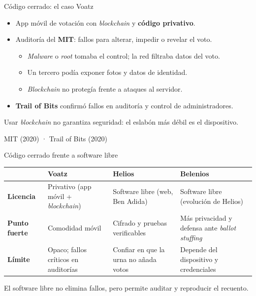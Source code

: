 \documentclass[aspectratio=169,12pt]{beamer}
\newcommand{\fuente}[1]{\vfill{\small\color{gris}#1\par}}
\begin{document}
\begin{frame}{Código cerrado: el caso Voatz}
  \begin{itemize}
    \item App móvil de votación con \textit{blockchain} y \textbf{código privativo}.
    \item Auditoría del \textbf{MIT}: fallos para alterar, impedir o revelar el voto.
    \begin{itemize}
      \item \textit{Malware} o \textit{root} tomaba el control; la red filtraba datos del voto.
      \item Un tercero podía exponer fotos y datos de identidad.
      \item \textit{Blockchain} no protegía frente a ataques al servidor.
    \end{itemize}
    \item \textbf{Trail of Bits} confirmó fallos en auditoría y control de administradores.
  \end{itemize}
  \vspace{0.2cm}
  {\large\alert{Usar \textit{blockchain} no garantiza seguridad: el eslabón más débil es el dispositivo.}}
  \fuente{MIT (2020) · Trail of Bits (2020)}
\end{frame}

\begin{frame}{Código cerrado frente a software libre}
  \begin{center}
  \small
  \renewcommand{\arraystretch}{1.25}
  \begin{tabular}{p{1.9cm} p{3.3cm} p{3.3cm} p{3.4cm}}
    & {\color{terra}\normalsize\bfseries Voatz} & {\color{azul}\normalsize\bfseries Helios} & {\color{azul}\normalsize\bfseries Belenios} \\
    \hline
    \textbf{Licencia} & \raggedright Privativo (app móvil + \textit{blockchain}) & \raggedright Software libre (web, Ben Adida) & \raggedright Software libre (evolución de Helios) \tabularnewline
    \hline
    \textbf{Punto fuerte} & \raggedright Comodidad móvil & \raggedright Cifrado y pruebas verificables & \raggedright Más privacidad y defensa ante \textit{ballot stuffing} \tabularnewline
    \hline
    \textbf{Límite} & \raggedright Opaco; fallos críticos en auditorías & \raggedright Confiar en que la urna no añada votos & \raggedright Depende del dispositivo y credenciales \tabularnewline
  \end{tabular}
  \end{center}
  \vspace{0.2cm}
  {\large\alert{El software libre no elimina fallos, pero permite auditar y reproducir el recuento.}}
\end{frame}
\end{document}
